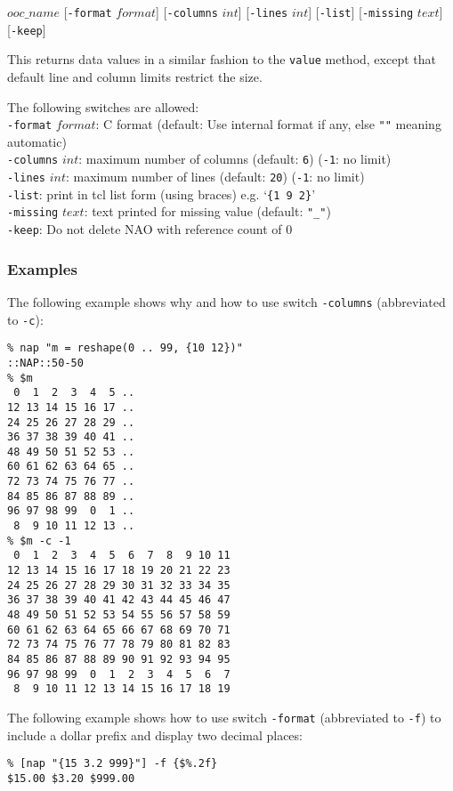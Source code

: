   $ooc\_name$ 
  [\texttt{-format} $format$]
  [\texttt{-columns} $int$]
  [\texttt{-lines} $int$]
  [\texttt{-list}]
  [\texttt{-missing} $text$]
  [\texttt{-keep}]

This returns data values in a similar fashion to the 
  \texttt{value} method, except that default line and column limits
  restrict the size.
  

The following switches are allowed:
  \\
  \texttt{-format} 
  $format$: C format (default: Use internal format if any,
  else \texttt{""} meaning automatic)
  \\
  \texttt{-columns} 
  $int$: maximum number of columns (default: 
  \texttt{6}) (\texttt{-1}: no limit)
  \\
  \texttt{-lines} 
  $int$: maximum number of lines (default: 
  \texttt{20}) (\texttt{-1}: no limit)
  \\
  \texttt{-list}: print in tcl list form (using braces) e.g. `\texttt{\{1 9 2\}}'
  \\
  \texttt{-missing} 
  $text$: text printed for missing value (default: 
  \texttt{"\_"})
  \\
  \texttt{-keep}: Do not delete NAO with reference count of 0

\subsubsection{Examples}

The following example shows why and how to use
  switch 
  \texttt{-columns} (abbreviated to 
  \texttt{-c}):
  \begin{verbatim}
% nap "m = reshape(0 .. 99, {10 12})"
::NAP::50-50
% $m
 0  1  2  3  4  5 ..
12 13 14 15 16 17 ..
24 25 26 27 28 29 ..
36 37 38 39 40 41 ..
48 49 50 51 52 53 ..
60 61 62 63 64 65 ..
72 73 74 75 76 77 ..
84 85 86 87 88 89 ..
96 97 98 99  0  1 ..
 8  9 10 11 12 13 ..
% $m -c -1
 0  1  2  3  4  5  6  7  8  9 10 11
12 13 14 15 16 17 18 19 20 21 22 23
24 25 26 27 28 29 30 31 32 33 34 35
36 37 38 39 40 41 42 43 44 45 46 47
48 49 50 51 52 53 54 55 56 57 58 59
60 61 62 63 64 65 66 67 68 69 70 71
72 73 74 75 76 77 78 79 80 81 82 83
84 85 86 87 88 89 90 91 92 93 94 95
96 97 98 99  0  1  2  3  4  5  6  7
 8  9 10 11 12 13 14 15 16 17 18 19
\end{verbatim}

  

The following example shows how to use switch 
  \texttt{-format} (abbreviated to 
  \texttt{-f}) to include a dollar prefix and display two decimal
  places:
  \begin{verbatim}
% [nap "{15 3.2 999}"] -f {$%.2f}
$15.00 $3.20 $999.00
\end{verbatim}


